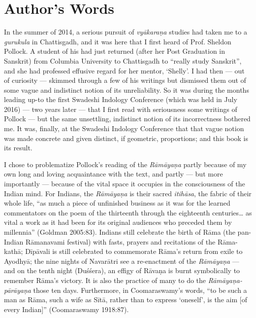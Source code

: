 \chapter*{Author's Words}\label{authors-words}


In the summer of 2014, a serious pursuit of {\sl vyākaraṇa} studies had taken me to a {\sl gurukula} in Chattisgadh, and it was here that I first heard of Prof. Sheldon Pollock. A student of his had just returned (after her Post Graduation in Sanskrit) from Columbia University to Chattisgadh to “really study Sanskrit”, and she had professed effusive regard for her mentor, ‘Shelly’. I had then --- out of curiosity --- skimmed through a few of his writings but dismissed them out of some vague and indistinct notion of its unreliability. So it was during the months leading up-to the first Swadeshi Indology Conference (which was held in July 2016) --- two years later --- that I first read with seriousness some writings of Pollock --- but the same unsettling, indistinct notion of its incorrectness bothered me. It was, finally, at the Swadeshi Indology Conference that that vague notion was made concrete and given distinct, if geometric, proportions; and this book is its result.  

I chose to problematize Pollock’s reading of the {\sl Rāmāyaṇa} partly because of my own long and loving acquaintance with the text, and partly --- but more importantly --- because of the vital space it occupies in the consciousness of the Indian mind. For Indians, the {\sl Rāmāyaṇa} is their sacred {\sl itihāsa}, the fabric of their whole life, “as much a piece of unfinished business as it was for the learned commentators on the poem of the thirteenth through the eighteenth centuries… as vital a work as it had been for its original audiences who preceded them by millennia” (Goldman 2005:83). Indians still celebrate the birth of Rāma (the pan-Indian Rāmanavami festival) with fasts, prayers and recitations of the Rāma-kathā; Dīpāvali is still celebrated to commemorate Rāma’s return from exile to Ayodhyā; the nine nights of Navarātri see a re-enactment of the {\sl Rāmāyaṇa} --- and on the tenth night (Duśśera), an effigy of Rāvaṇa is burnt symbolically to remember Rāma’s victory. It is also the practice of many to do the {\sl Rāmāyaṇa-pārāyaṇa} those ten days. Furthermore, in Coomaraswamy’s words, “to be such a man as Rāma, such a wife as Sītā, rather than to express ‘oneself’, is the aim [of every Indian]” (Coomaraswamy 1918:87).

